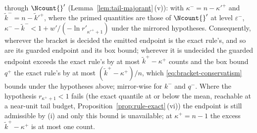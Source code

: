 \begin{proposition}
\begin{enumerate}[label=(\roman*),leftmargin=2.2em]
through $\Ncount{}'$ (Lemma~\ref{lem:tail-majorant}\,(v)): with
$\kappa^{-}=n-\kappa'^{+}$ and $\tilde k^{-}=n-\tilde k'^{+}$, where the
primed quantities are those of $\Ncount{}'$ at level $\varepsilon^{-}$,
$\kappa^{-}-\tilde k^{-}<1+w'/(-\ln r'_{\kappa'^{+}+1})$ under the mirrored
hypotheses. Consequently, wherever the bracket is decided the emitted
endpoint is the exact rule's, and so are its guarded endpoint and its box
bound; wherever it is undecided the guarded endpoint exceeds the exact rule's
by at most $\tilde k^{+}-\kappa^{+}$ counts and the box bound $q^{+}$ the
exact rule's by at most $(\tilde k^{+}-\kappa^{+})/n$, which
\eqref{eq:bracket-conservatism} bounds under the hypotheses above;
mirror-wise for $k^{-}$ and $q^{-}$. Where the hypothesis $r_{\kappa^{+}+1}<1$ fails (the
exact quantile at or below the mean, reachable at a near-unit tail budget,
Proposition~\ref{prop:rule-exact}\,(vi)) the endpoint is still admissible by
(i) and only this bound is unavailable; at $\kappa^{+}=n-1$ the excess
$\tilde k^{+}-\kappa^{+}$ is at most one count.
\end{enumerate}
\end{proposition}

